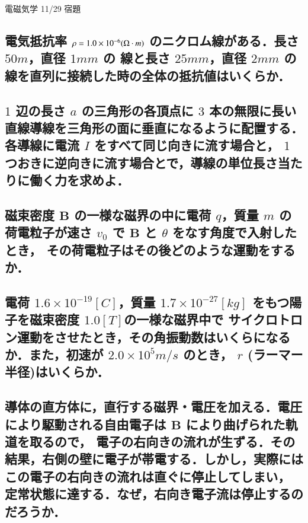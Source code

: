 \documentclass[a4paper, 12pt]{bxjsarticle}
\begin{document}
\begin{center}
    \begin{huge}
        電磁気学 11/29 宿題
    \end{huge}
\end{center}

\subsection{電気抵抗率 \(\rho = 1.0\times10^{-6}\si(\Omega \cdot m)\) のニクロム線がある．長さ \(50\si{m}\)，直径 \(1\si{mm}\) の%
線と長さ \(25\si{mm}\)，直径 \(2\si{mm}\) の線を直列に接続した時の全体の抵抗値はいくらか．}
\vspace{20em}

\subsection{\(1\) 辺の長さ \(a\) の三角形の各頂点に \(3\) 本の無限に長い直線導線を三角形の面に垂直になるように配置する．各導線に電流 \(I\) をすべて同じ向きに流す場合と，%
\(1\) つおきに逆向きに流す場合とで，導線の単位長さ当たりに働く力を求めよ．}

\newpage
\subsection{磁束密度 \(\boldsymbol{B}\) の一様な磁界の中に電荷 \(q\)，質量 \(m\) の荷電粒子が速さ \(v_0\) で \(\boldsymbol{B}\) と \(\theta\) をなす角度で入射したとき，%
その荷電粒子はその後どのような運動をするか．}
\vspace{20em}

\subsection{電荷 \(1.6\times10^{-19}\si{[C]}\)，質量 \(1.7\times10^{-27}\si{[kg]}\) をもつ陽子を磁束密度 \(1.0\si{[T]}\)の一様な磁界中で%
サイクロトロン運動をさせたとき，その角振動数はいくらになるか．また，初速が \(2.0\times10^{5}\si{m/s}\) のとき，%
\(r\) (ラーマー半径)はいくらか．}
\newpage

\subsection{導体の直方体に，直行する磁界・電圧を加える．電圧により駆動される自由電子は \(\boldsymbol{B}\) により曲げられた軌道を取るので，%
電子の右向きの流れが生ずる．その結果，右側の壁に電子が帯電する．しかし，実際にはこの電子の右向きの流れは直ぐに停止してしまい，%
定常状態に達する．なぜ，右向き電子流は停止するのだろうか．}
\end{document}
